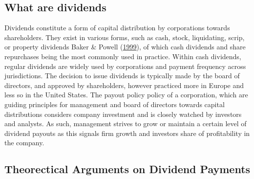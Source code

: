 \documentclass[11pt,preprint, authoryear]{elsarticle}
\numberwithin{equation}{section}
\numberwithin{figure}{section}
\numberwithin{table}{section}
\begin{document}
\hypertarget{what-are-dividends}{%
\subsection{What are dividends}\label{what-are-dividends}}

Dividends constitute a form of capital distribution by corporations
towards shareholders. They exist in various forms, such as cash, stock,
liquidating, scrip, or property dividends Baker \& Powell
(\protect\hyperlink{ref-baker1999corporate}{1999}), of which cash
dividends and share repurchases being the most commonly used in
practice. Within cash dividends, regular dividends are widely used by
corporations and payment frequency across jurisdictions. The decision to
issue dividends is typically made by the board of directors, and
approved by shareholders, however practiced more in Europe and less so
in the United States. The payout policy policy of a corporation, which
are guiding principles for management and board of directors towards
capital distributions considers company investment and is closely
watched by investors and analysts. As such, management strives to grow
or maintain a certain level of dividend payouts as this signals firm
growth and investors share of profitability in the company.

\hypertarget{theorectical-arguments-on-dividend-payments}{%
\subsection{Theorectical Arguments on Dividend
Payments}\label{theorectical-arguments-on-dividend-payments}}
\end{document}
